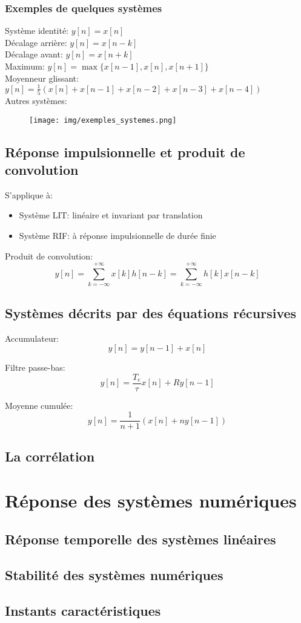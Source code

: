 \documentclass[10pt, twocolumn]{article}
\begin{document}
			\subsubsection*{Exemples de quelques systèmes}
				Système identité: $y[n]=x[n]$ \\
				Décalage arrière: $y[n]=x[n-k]$ \\
				Décalage avant: $y[n]=x[n+k]$ \\
				Maximum: $y[n]=\max \{x[n-1], x[n], x[n+1]\}$ \\
				Moyenneur glissant: $y[n]=\frac{1}{5}(x[n]+x[n-1]+x[n-2]+x[n-3]+x[n-4])$ \\
				
				Autres systèmes:
				
				\begin{figure}[h!]
					\texttt{[image: img/exemples\_systemes.png]}
					\centering
				\end{figure}
				
			
		\subsection*{Réponse impulsionnelle et produit de convolution}
			
			S'applique à:
			\begin{itemize}
				\item Système LIT: linéaire et invariant par translation
				\item Système RIF: à réponse impulsionnelle de durée finie
			\end{itemize}
			
			Produit de convolution:
			\[y[n]=\sum_{k=-\infty}^{+\infty} x[k] h[n-k]=\sum_{k=-\infty}^{+\infty} h[k] x[n-k]\]
			
		\subsection*{Systèmes décrits par des équations récursives}
			
			Accumulateur:
			\[y[n]=y[n-1]+x[n]\]
			
			Filtre passe-bas:
			\[y[n]=\frac{T_{e}}{\tau} x[n]+R y[n-1]\]
			
			Moyenne cumulée:
			\[y[n]=\frac{1}{n+1}(x[n]+n y[n-1])\]
			
		\subsection*{La corrélation}
			
			
	\section*{Réponse des systèmes numériques}
		
		\subsection*{Réponse temporelle des systèmes linéaires}
		\subsection*{Stabilité des systèmes numériques}
		\subsection*{Instants caractéristiques}
		
		
		
		
		
\end{document}
